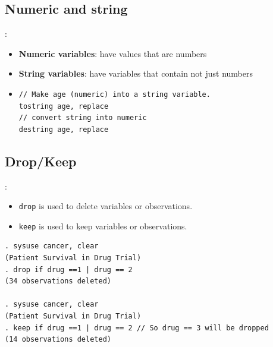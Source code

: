 \subsection{Numeric and string}
\begin{frame}[fragile]{\secname : \subsecname}
\begin{itemize}
\item \textbf{Numeric variables}: have values that are numbers \\
\item \textbf{String variables}: have variables that contain not just numbers
\item<2|handout:2>[] \begin{verbatim}
// Make age (numeric) into a string variable.
tostring age, replace
// convert string into numeric
destring age, replace	
 \end{verbatim}

\end{itemize}
\end{frame}

\subsection{Drop/Keep}
\begin{frame}[fragile]{\secname : \subsecname}
\begin{itemize}
	\item \verb|drop| is used to delete variables or observations.
	\item \verb|keep| is used to keep variables or observations.
\end{itemize}

\small
\begin{verbatim}
. sysuse cancer, clear
(Patient Survival in Drug Trial)
. drop if drug ==1 | drug == 2
(34 observations deleted)

. sysuse cancer, clear
(Patient Survival in Drug Trial)
. keep if drug ==1 | drug == 2 // So drug == 3 will be dropped
(14 observations deleted)
\end{verbatim}
\end{frame}

